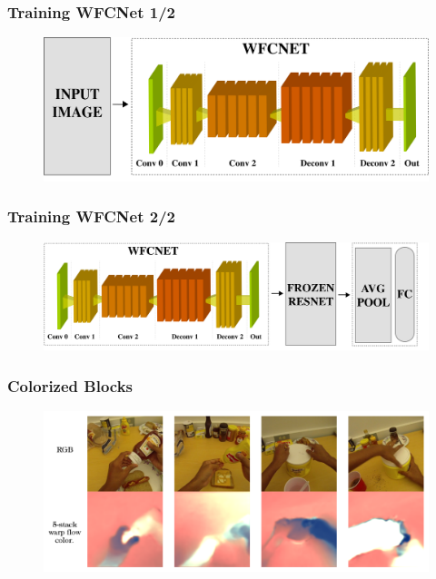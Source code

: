\documentclass{beamer}
\begin{document}
\begin{frame}
\frametitle{Training WFCNet 1/2}

\begin{figure}
\centering
\includegraphics[height=0.40\textheight]{./schemi/training_WFC1}
\end{figure}
 
\end{frame}

\begin{frame}
\frametitle{Training WFCNet 2/2}

\begin{figure}
\centering
\includegraphics[height=0.40\textheight]{./schemi/training_WFC2}
\end{figure}
 
\end{frame}

\begin{frame}
\frametitle{Colorized Blocks}

\begin{figure}
\centering
\includegraphics[height=0.50\textheight]{./schemi/wfcnet_color_img}
\end{figure}
 
\end{frame}
\end{document}
